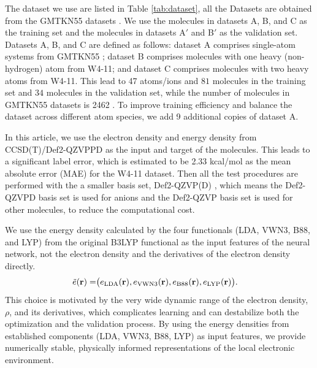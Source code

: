 \documentclass[%
twocolumn,
amsmath,
amssymb,
groupedaddress,
reprint,%
]{revtex4-2}
\newcommand{\Tab}[1]{Table \ref{#1}}
\newcommand{\brm}[1]{\bm{\mathrm{#1}}}
\begin{document}
The dataset we use are listed in \Tab{tab:dataset}, all the Datasets are obtained from the GMTKN55 datasets \cite{goerigkLookDensityFunctional2017}.
% 
We use the molecules in datasets A, B, and C as the training set and the molecules in datasets A$'$ and B$'$ as the validation set.
% 
Datasets A, B, and C are defined as follows: dataset A comprises single-atom systems from GMTKN55 \cite{goerigkLookDensityFunctional2017}; dataset B comprises molecules with one heavy (non-hydrogen) atom from W4-11; and dataset C comprises molecules with two heavy atoms from W4-11.
% 
This lead to 47 atoms/ions and $81$ molecules in the training set and $34$ molecules in the validation set, while the number of molecules in GMTKN55 datasets is 2462 \cite{goerigkLookDensityFunctional2017}.
To improve training efficiency and balance the dataset across different atom species, we add 9 additional copies of dataset A.

In this article, we use the electron density and energy density from CCSD(T)/Def2-QZVPPD \cite{bartlettCoupledclusterTheoryQuantum2007-02-22,weigendBalancedBasisSets2005,zhengMinimallyAugmentedKarlsruhe2011-02} as the input and target of the molecules.
%
This leads to a significant label error, which is estimated to be 2.33 kcal/mol as the mean absolute error (MAE) for the W4-11 dataset.
%
Then all the test procedures are performed with the a smaller basis set, Def2-QZVP(D) \cite{weigendBalancedBasisSets2005,zhengMinimallyAugmentedKarlsruhe2011-02}, which means the Def2-QZVPD basis set is used for anions and the Def2-QZVP basis set is used for other molecules, to reduce the computational cost.

We use the energy density calculated by the four functionals (LDA, VWN3, B88, and LYP) from the original B3LYP functional \cite{perdewAtomsMoleculesSolids1992-09-15} as the input features of the neural network, not the electron density and the derivatives of the electron density directly.
% 
\begin{align}
  \tilde{e}(\brm{r}) =
   & \big( e_{\rm{LDA}}(\brm{r}), e_{\rm{VWN3}}(\brm{r}), e_{\rm{B88}}(\brm{r}), e_{\rm{LYP}}(\brm{r}) \big).
\end{align}
%
This choice is motivated by the very wide dynamic range of the electron density, $\rho$, and its derivatives, which complicates learning and can destabilize both the optimization and the validation process.
%
By using the energy densities from established components (LDA, VWN3, B88, LYP) as input features, we provide numerically stable, physically informed representations of the local electronic environment.
\end{document}
